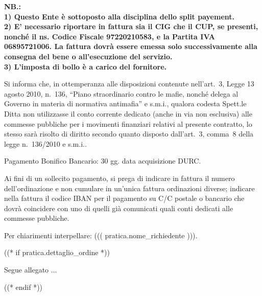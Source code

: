 \documentclass[a4paper,12pt]{letter}
\begin{document}
{\tiny\bf NB.: \\
1) Questo Ente è sottoposto alla disciplina dello split payement. \\
2) E' necessario riportare in fattura sia il CIG che il CUP, se presenti,
nonché il ns. Codice Fiscale 97220210583, e la Partita IVA 06895721006.
La fattura dovrà essere emessa solo successivamente alla consegna del bene o all’esecuzione del servizio.\\
3) L'imposta di bollo è a carico del fornitore.

Si informa che, in ottemperanza alle disposizioni contenute nell'art.~3, Legge 13 agosto 2010, n.~136,
``Piano straordinario contro le mafie, nonch\'e delega al Governo in materia di normativa antimafia''
e s.m.i., qualora codesta Spett.le Ditta non utilizzasse il conto corrente dedicato 
(anche in via non esclusiva) alle commesse pubbliche per i movimenti finanziari 
relativi al presente contratto, lo stesso sarà risolto di diritto secondo quanto 
disposto dall'art.~3, comma~8 della legge n.~136/2010 e s.m.i..

Pagamento Bonifico Bancario: 30 gg. data acquisizione DURC.

Ai fini di un sollecito pagamento, si prega di
indicare in fattura il numero dell'ordinazione e non cumulare in un'unica fattura 
ordinazioni diverse;
indicare nella fattura il codice IBAN per il pagamento su C/C postale o bancario 
che dovrà coincidere con uno di quelli già comunicati quali conti dedicati alle commesse pubbliche.

Per chiarimenti interpellare: ((( pratica.nome_richiedente ))).
}

((* if pratica.dettaglio_ordine *))
\vspace{0.5cm}
\begin{flushright}
Segue allegato ...
\end{flushright}

\newpage
\vspace{2cm}
\quad
((* endif *))

\vspace{1cm}
\end{document}

